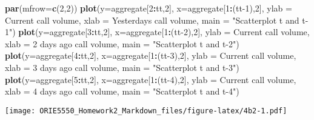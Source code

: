 \documentclass[
]{article}
\newenvironment{Shaded}{\begin{snugshade}}{\end{snugshade}}
\newcommand{\AttributeTok}[1]{\textcolor[rgb]{0.13,0.29,0.53}{#1}}
\newcommand{\DecValTok}[1]{\textcolor[rgb]{0.00,0.00,0.81}{#1}}
\newcommand{\FunctionTok}[1]{\textcolor[rgb]{0.13,0.29,0.53}{\textbf{#1}}}
\newcommand{\NormalTok}[1]{#1}
\newcommand{\SpecialCharTok}[1]{\textcolor[rgb]{0.81,0.36,0.00}{\textbf{#1}}}
\newcommand{\StringTok}[1]{\textcolor[rgb]{0.31,0.60,0.02}{#1}}
\begin{document}
\begin{Shaded}
\begin{Highlighting}[]
\FunctionTok{par}\NormalTok{(}\AttributeTok{mfrow=}\FunctionTok{c}\NormalTok{(}\DecValTok{2}\NormalTok{,}\DecValTok{2}\NormalTok{))}
\FunctionTok{plot}\NormalTok{(}\AttributeTok{y=}\NormalTok{aggregate[}\DecValTok{2}\SpecialCharTok{:}\NormalTok{tt,}\DecValTok{2}\NormalTok{], }\AttributeTok{x=}\NormalTok{aggregate[}\DecValTok{1}\SpecialCharTok{:}\NormalTok{(tt}\DecValTok{{-}1}\NormalTok{),}\DecValTok{2}\NormalTok{], }\AttributeTok{ylab =} \StringTok{\textquotesingle{}Current call volume\textquotesingle{}}\NormalTok{,}
     \AttributeTok{xlab =} \StringTok{\textquotesingle{}Yesterdays call volume\textquotesingle{}}\NormalTok{, }\AttributeTok{main =} \StringTok{"Scatterplot t and t{-}1"}\NormalTok{)}
\FunctionTok{plot}\NormalTok{(}\AttributeTok{y=}\NormalTok{aggregate[}\DecValTok{3}\SpecialCharTok{:}\NormalTok{tt,}\DecValTok{2}\NormalTok{], }\AttributeTok{x=}\NormalTok{aggregate[}\DecValTok{1}\SpecialCharTok{:}\NormalTok{(tt}\DecValTok{{-}2}\NormalTok{),}\DecValTok{2}\NormalTok{], }\AttributeTok{ylab =} \StringTok{\textquotesingle{}Current call volume\textquotesingle{}}\NormalTok{,}
     \AttributeTok{xlab =} \StringTok{\textquotesingle{}2 days ago call volume\textquotesingle{}}\NormalTok{, }\AttributeTok{main =} \StringTok{"Scatterplot t and t{-}2"}\NormalTok{)}
\FunctionTok{plot}\NormalTok{(}\AttributeTok{y=}\NormalTok{aggregate[}\DecValTok{4}\SpecialCharTok{:}\NormalTok{tt,}\DecValTok{2}\NormalTok{], }\AttributeTok{x=}\NormalTok{aggregate[}\DecValTok{1}\SpecialCharTok{:}\NormalTok{(tt}\DecValTok{{-}3}\NormalTok{),}\DecValTok{2}\NormalTok{], }\AttributeTok{ylab =} \StringTok{\textquotesingle{}Current call volume\textquotesingle{}}\NormalTok{,}
     \AttributeTok{xlab =} \StringTok{\textquotesingle{}3 days ago call volume\textquotesingle{}}\NormalTok{, }\AttributeTok{main =} \StringTok{"Scatterplot t and t{-}3"}\NormalTok{)}
\FunctionTok{plot}\NormalTok{(}\AttributeTok{y=}\NormalTok{aggregate[}\DecValTok{5}\SpecialCharTok{:}\NormalTok{tt,}\DecValTok{2}\NormalTok{], }\AttributeTok{x=}\NormalTok{aggregate[}\DecValTok{1}\SpecialCharTok{:}\NormalTok{(tt}\DecValTok{{-}4}\NormalTok{),}\DecValTok{2}\NormalTok{], }\AttributeTok{ylab =} \StringTok{\textquotesingle{}Current call volume\textquotesingle{}}\NormalTok{,}
     \AttributeTok{xlab =} \StringTok{\textquotesingle{}4 days ago call volume\textquotesingle{}}\NormalTok{, }\AttributeTok{main =} \StringTok{"Scatterplot t and t{-}4"}\NormalTok{)}
\end{Highlighting}
\end{Shaded}

\texttt{[image: ORIE5550\_Homework2\_Markdown\_files/figure-latex/4b2-1.pdf]}
\end{document}
